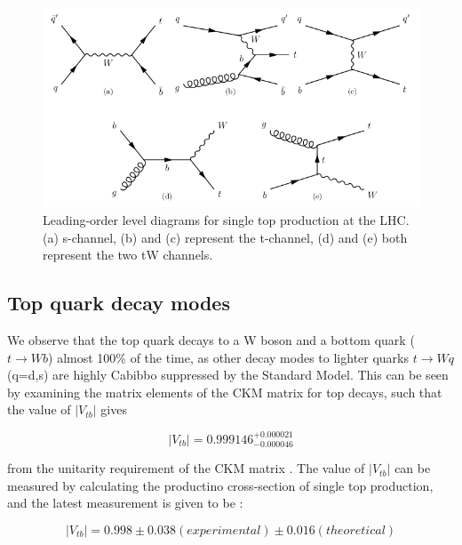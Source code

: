 \begin{figure} 
\begin{center}
\includegraphics[width=\textwidth]{Figures/singletopProductionLHC.png}
\end{center}
\caption{Leading-order level diagrams for single top production at the LHC. {(a)} s-channel, {(b)} and {(c)} represent the t-channel, {(d)} and {(e)} both represent the two tW channels. \cite{SergeyThesis}}
\label{fig-singletopProductionLHC}
\end{figure}

\subsection{Top quark decay modes} \label{subsec-TopDecayModes}

We observe that the top quark decays to a W boson and a bottom quark ($t \to Wb$) almost 100\% of the time, as other decay modes to lighter quarks $t \to Wq$ (q=d,s) are highly Cabibbo suppressed by the Standard Model. This can be seen by examining the matrix elements of the CKM matrix for top decays, such that the value of $|V_{tb}|$ gives

\begin{equation}
|V_{tb}| = 0.999146^{+0.000021}_{-0.000046}
\end{equation}

from the unitarity requirement of the CKM matrix \cite{PhysRevD.86.010001}. The value of $|V_{tb}|$ can be measured by calculating the productino cross-section of single top production, and the latest measurement is given to be \cite{Khachatryan:2014iya}:

\begin{equation}
|V_{tb}| = 0.998 \pm 0.038 (experimental) \pm 0.016 (theoretical)
\end{equation}

